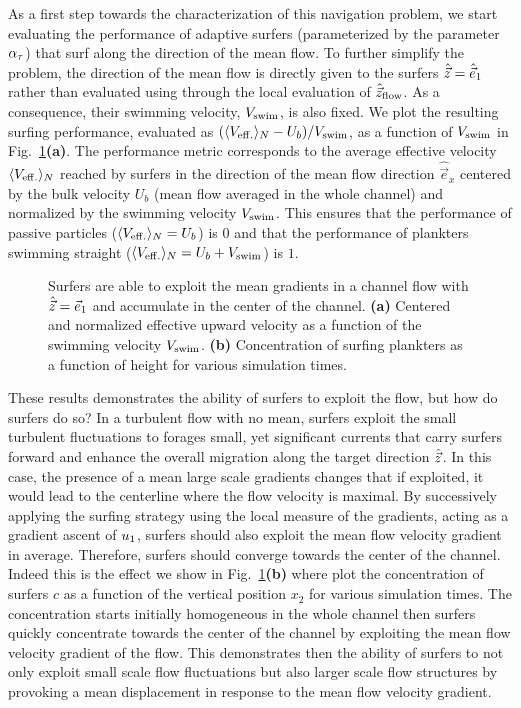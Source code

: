 As a first step towards the characterization of this navigation problem, we start evaluating the performance of adaptive surfers (parameterized by the parameter $\alpha_{\tau}$) that surf along the direction of the mean flow.
To further simplify the problem, the direction of the mean flow is directly given to the surfers $\hat{\vec{z}} = \hat{\vec{e}}_1$ rather than evaluated using through the local evaluation of $\hat{\vec{z}}_{\mathrm{flow}}$.
As a consequence, their swimming velocity, $V_{\mathrm{swim}}$, is also fixed.
We plot the resulting surfing performance, evaluated as $(\langle V_{\mathrm{eff.}} \rangle_N - U_b)/V_{\mathrm{swim}}$, as a function of $V_{\mathrm{swim}}$ in Fig.~\ref{fig:channel_perf_x}\textbf{(a)}.
The performance metric corresponds to the average effective velocity $\langle V_{\mathrm{eff.}} \rangle_N$ reached by surfers in the direction of the mean flow direction $\hat{\vec{e}}_x$ centered by the bulk velocity $U_b$ (mean flow averaged in the whole channel) and normalized by the swimming velocity $V_{\mathrm{swim}}$.
This ensures that the performance of passive particles ($\langle V_{\mathrm{eff.}} \rangle_N = U_b$) is $0$ and that the performance of plankters swimming straight ($\langle V_{\mathrm{eff.}} \rangle_N = U_b + V_{\mathrm{swim}}$) is $1$.
\begin{figure}
	\centering
	
	\caption{
		Surfers are able to exploit the mean gradients in a channel flow with $\hat{\vec{z}} = \vec{e}_1$ and accumulate in the center of the channel.
		\textbf{(a)} Centered and normalized effective upward velocity as a function of the swimming velocity $V_{\mathrm{swim}}$.
		\textbf{(b)} Concentration of surfing plankters as a function of height for various simulation times.
	}
	\label{fig:channel_perf_x}
\end{figure}

These results demonstrates the ability of surfers to exploit the flow, but how do surfers do so?
In a turbulent flow with no mean, surfers exploit the small turbulent fluctuations to forages small, yet significant currents that carry surfers forward and enhance the overall migration along the target direction $\hat{\vec{z}}$.
In this case, the presence of a mean large scale gradients changes that if exploited, it would lead to the centerline where the flow velocity is maximal.
By successively applying the surfing strategy using the local measure of the gradients, acting as a gradient ascent of $u_1$, surfers should also exploit the mean flow velocity gradient in average.
Therefore, surfers should converge towards the center of the channel.
Indeed this is the effect we show in Fig.~\ref{fig:channel_perf_x}\textbf{(b)} where plot the concentration of surfers $c$ as a function of the vertical position $x_2$ for various simulation times.
The concentration starts initially homogeneous in the whole channel then surfers quickly concentrate towards the center of the channel by exploiting the mean flow velocity gradient of the flow.
This demonstrates then the ability of surfers to not only exploit small scale flow fluctuations but also larger scale flow structures by provoking a mean displacement in response to the mean flow velocity gradient.

